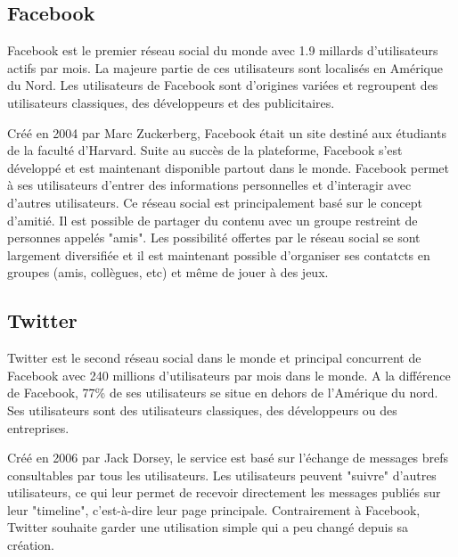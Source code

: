 \documentclass[a4paper,10pt]{article}
\begin{document}

\subsection{Facebook}
Facebook est le premier réseau social du monde avec 1.9 millards d'utilisateurs actifs par mois. La majeure partie de ces utilisateurs sont localisés en Amérique du Nord. Les utilisateurs de Facebook sont d'origines variées et regroupent des utilisateurs classiques, des développeurs et des publicitaires.


Créé en 2004 par Marc Zuckerberg, Facebook était un site destiné aux étudiants de la faculté d'Harvard. Suite au succès de la plateforme, Facebook s'est développé et est maintenant disponible partout dans le monde. Facebook permet à ses utilisateurs d'entrer des informations personnelles et d’interagir avec d'autres utilisateurs. Ce réseau social est principalement basé sur le concept d'amitié. Il est possible de partager du contenu avec un groupe restreint de personnes appelés "amis".
Les possibilité offertes par le réseau social se sont largement diversifiée et il est maintenant possible d'organiser ses contatcts en groupes (amis, collègues, etc) et même de jouer à des jeux.


\subsection{Twitter}

Twitter est le second réseau social dans le monde et principal concurrent de Facebook avec 240 millions d'utilisateurs par mois dans le monde. A la différence de Facebook, 77\% de ses utilisateurs se situe en dehors de l’Amérique du nord. Ses utilisateurs sont des utilisateurs classiques, des développeurs ou des entreprises.

Créé en 2006 par Jack Dorsey, le service est basé sur l'échange de messages brefs consultables par tous les utilisateurs. Les utilisateurs peuvent "suivre" d'autres utilisateurs, ce qui leur permet de recevoir directement les messages publiés sur leur "timeline", c'est-à-dire leur page principale. Contrairement à Facebook, Twitter souhaite garder une utilisation simple qui a peu changé depuis sa création. 
\end{document}
